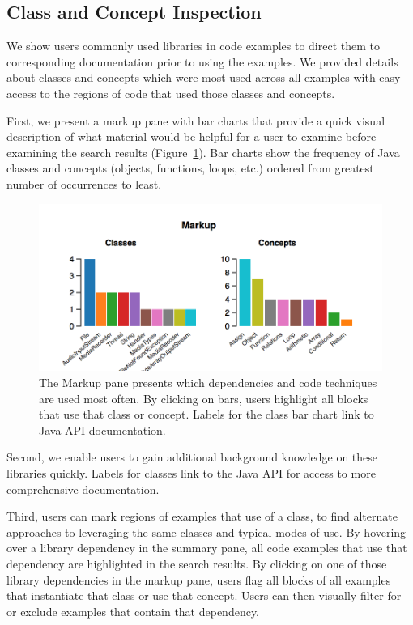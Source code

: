 \subsection{Class and Concept Inspection}

We show users commonly used libraries in code examples to direct them to corresponding documentation prior to using the examples.
We provided details about classes and concepts which were most used across all examples with easy access to the regions of code that used those classes and concepts.

First, we present a markup pane with bar charts that provide a quick visual description of what material would be helpful for a user to examine before examining the search results (Figure~\ref{fig:markup_pane}).
Bar charts show the frequency of Java classes and concepts (objects, functions, loops, etc.) ordered from greatest number of occurrences to least.

\begin{figure}[b]
 \centering
 \includegraphics[width=\columnwidth]{figures/markup_bar}
 \caption{The Markup pane presents which dependencies and code techniques are used most often.  By clicking on bars, users highlight all blocks that use that class or concept.  Labels for the class bar chart link to Java API documentation.}
 \label{fig:markup_pane}
\end{figure}

Second, we enable users to gain additional background knowledge on these libraries quickly.
Labels for classes link to the Java API for access to more comprehensive documentation.

Third, users can mark regions of examples that use of a class, to find alternate approaches to leveraging the same classes and typical modes of use.
By hovering over a library dependency in the summary pane, all code examples that use that dependency are highlighted in the search results.
By clicking on one of those library dependencies in the markup pane, users flag all blocks of all examples that instantiate that class or use that concept.
Users can then visually filter for or exclude examples that contain that dependency.

